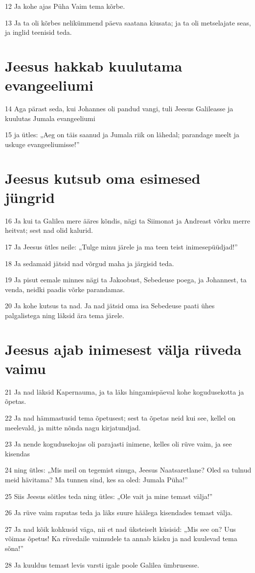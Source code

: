\par 12 Ja kohe ajas Püha Vaim tema kõrbe.
\par 13 Ja ta oli kõrbes nelikümmend päeva saatana kiusata; ja ta oli metselajate seas, ja inglid teenisid teda.
\section*{Jeesus hakkab kuulutama evangeeliumi}

\par 14 Aga pärast seda, kui Johannes oli pandud vangi, tuli Jeesus Galileasse ja kuulutas Jumala evangeeliumi
\par 15 ja ütles: „Aeg on täis saanud ja Jumala riik on lähedal; parandage meelt ja uskuge evangeeliumisse!”

\section*{Jeesus kutsub oma esimesed jüngrid}

\par 16 Ja kui ta Galilea mere ääres kõndis, nägi ta Siimonat ja Andreast võrku merre heitvat; sest nad olid kalurid.
\par 17 Ja Jeesus ütles neile: „Tulge minu järele ja ma teen teist inimesepüüdjad!”
\par 18 Ja sedamaid jätsid nad võrgud maha ja järgisid teda.
\par 19 Ja pisut eemale minnes nägi ta Jakoobust, Sebedeuse poega, ja Johannest, ta venda, neidki paadis võrke parandamas.
\par 20 Ja kohe kutsus ta nad. Ja nad jätsid oma isa Sebedeuse paati ühes palgalistega ning läksid ära tema järele.

\section*{Jeesus ajab inimesest välja rüveda vaimu}

\par 21 Ja nad läksid Kapernauma, ja ta läks hingamispäeval kohe kogudusekotta ja õpetas.
\par 22 Ja nad hämmastusid tema õpetusest; sest ta õpetas neid kui see, kellel on meelevald, ja mitte nõnda nagu kirjatundjad.
\par 23 Ja nende kogudusekojas oli parajasti inimene, kelles oli rüve vaim, ja see kisendas
\par 24 ning ütles: „Mis meil on tegemist sinuga, Jeesus Naatsaretlane? Oled sa tulnud meid hävitama? Ma tunnen sind, kes sa oled: Jumala Püha!”
\par 25 Siis Jeesus sõitles teda ning ütles: „Ole vait ja mine temast välja!”
\par 26 Ja rüve vaim raputas teda ja läks suure häälega kisendades temast välja.
\par 27 Ja nad kõik kohkusid väga, nii et nad üksteiselt küsisid: „Mis see on? Uus võimas õpetus! Ka rüvedaile vaimudele ta annab käsku ja nad kuulevad tema sõna!”
\par 28 Ja kuuldus temast levis varsti igale poole Galilea ümbrusesse.

